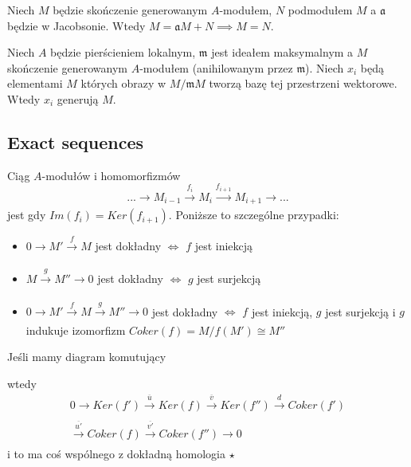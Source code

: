 \documentclass[twocolumn]{article}
\begin{document}
Niech $M$ będzie skończenie generowanym $A$-modułem, $N$ podmodułem $M$ a $\mathfrak{a}$ będzie w Jacobsonie. Wtedy $M=\mathfrak{a}M+N\implies M=N$.

Niech $A$ będzie pierścieniem lokalnym, $\mathfrak{m}$ jest ideałem maksymalnym a $M$ skończenie generowanym $A$-modułem (anihilowanym przez $\mathfrak{m}$). Niech $x_i$ będą elementami $M$ których obrazy w $M/\mathfrak{m}M$ tworzą bazę tej przestrzeni wektorowe. Wtedy $x_i$ generują $M$.

\subsection{Exact sequences}

Ciąg $A$-modułów i homomorfizmów
$$...\rightarrow M_{i-1}\xrightarrow[]{f_i}M_i\xrightarrow[]{f_{i+1}}M_{i+1}\rightarrow...$$
jest  gdy $Im(f_i)=Ker(f_{i+1})$. Poniższe to szczególne przypadki:
\begin{itemize}[leftmargin=*,label=\PHtunny]
    \item $0\rightarrow M'\xrightarrow[]{f}M$ jest dokładny $\iff$ $f$ jest iniekcją
    \item $M\xrightarrow[]{g}M''\rightarrow0$ jest dokładny $\iff$ $g$ jest surjekcją
    \item $0\rightarrow M'\xrightarrow[]{f}M\xrightarrow[]{g}M''\rightarrow0$ jest dokładny $\iff$ $f$ jest iniekcją, $g$ jest surjekcją i $g$ indukuje izomorfizm $Coker(f)=M/f(M')\cong M''$
\end{itemize}

Jeśli mamy diagram komutujący


wtedy
\begin{align*}
0\rightarrow Ker(f')\xrightarrow[]{\overline u}Ker(f)\xrightarrow[]{\overline{v}}Ker(f'')
\xrightarrow[]{d}Coker(f')\\
\xrightarrow[]{\overline{u'}}Coker(f)\xrightarrow[]{\overline{v'}}Coker(f'')\rightarrow0
\end{align*}
i to ma coś wspólnego z dokładną homologia $\star$
\end{document}
